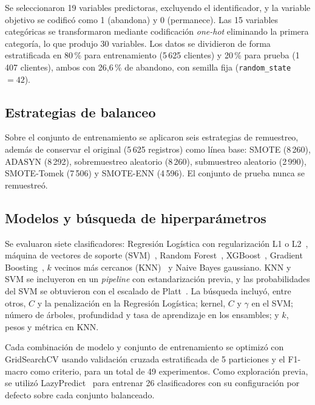 \documentclass[conference]{IEEEtran}
\begin{document}
Se seleccionaron 19 variables predictoras, excluyendo el identificador, y la variable objetivo se codificó como 1 (abandona) y 0 (permanece). Las 15 variables categóricas se transformaron mediante codificación \emph{one-hot} eliminando la primera categoría, lo que produjo 30 variables. Los datos se dividieron de forma estratificada en 80\,\% para entrenamiento (5\,625 clientes) y 20\,\% para prueba (1\,407 clientes), ambos con 26,6\,\% de abandono, con semilla fija (\texttt{random\_state}~$=42$).

\subsection{Estrategias de balanceo}

Sobre el conjunto de entrenamiento se aplicaron seis estrategias de remuestreo, además de conservar el original (5\,625 registros) como línea base: SMOTE (8\,260), ADASYN (8\,292), sobremuestreo aleatorio (8\,260), submuestreo aleatorio (2\,990), SMOTE-Tomek (7\,506) y SMOTE-ENN (4\,596). El conjunto de prueba nunca se remuestreó.

\subsection{Modelos y búsqueda de hiperparámetros}

Se evaluaron siete clasificadores: Regresión Logística con regularización L1 o L2~\cite{tibshirani1996lasso}, máquina de vectores de soporte (SVM)~\cite{cortes1995svm}, Random Forest~\cite{breiman2001rf}, XGBoost~\cite{chen2016xgboost}, Gradient Boosting~\cite{friedman2001gbm}, $k$ vecinos más cercanos (KNN)~\cite{cover1967knn} y Naive Bayes gaussiano. KNN y SVM se incluyeron en un \emph{pipeline} con estandarización previa, y las probabilidades del SVM se obtuvieron con el escalado de Platt~\cite{platt1999probabilistic}. La búsqueda incluyó, entre otros, $C$ y la penalización en la Regresión Logística; kernel, $C$ y $\gamma$ en el SVM; número de árboles, profundidad y tasa de aprendizaje en los ensambles; y $k$, pesos y métrica en KNN.

Cada combinación de modelo y conjunto de entrenamiento se optimizó con GridSearchCV usando validación cruzada estratificada de 5 particiones y el F1-macro como criterio, para un total de 49 experimentos. Como exploración previa, se utilizó LazyPredict~\cite{lazypredict} para entrenar 26 clasificadores con su configuración por defecto sobre cada conjunto balanceado.
\end{document}
